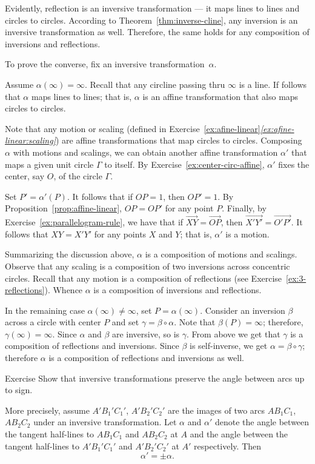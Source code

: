 Evidently, reflection is an inversive transformation --- it maps lines to lines and circles to circles.
According to Theorem~\ref{thm:inverse-cline}, any inversion is an inversive transformation as well.
Therefore, the same holds for any composition of inversions and reflections.

To prove the converse, 
fix an inversive transformation~$\alpha$.

Assume $\alpha(\infty)=\infty$.
Recall that any circline passing thru $\infty$ is a line.
If follows that $\alpha$ maps lines to lines;
that is,
$\alpha$ is an affine transformation that also maps circles to circles.

Note that any motion or scaling (defined in Exercise~\ref{ex:afine-linear}\textit{\ref{ex:afine-linear:scaling}}) are affine transformations that map circles to circles.
Composing $\alpha$ with motions and scalings, we can obtain another affine transformation $\alpha'$ that maps a given unit circle $\Gamma$ to itself.
By Exercise~\ref{ex:center-circ-affine},
$\alpha'$ fixes the center, say $O$, of the circle $\Gamma$.

Set $P'=\alpha'(P)$.
It follows that if $OP=1$, then $OP'=1$.
By Proposition~\ref{prop:affine-linear}, $OP=OP'$ for any point $P$.
Finally, by Exercise~\ref{ex:parallelogram-rule}, we have that if 
$\overrightarrow{XY}=\overrightarrow{OP}$, then $\overrightarrow{X'Y'}=\overrightarrow{O'P'}$.
It follows that $XY=X'Y'$ for any points $X$ and $Y$;
that is, $\alpha'$ is a motion.

Summarizing the discussion above, $\alpha$ is a composition of motions and scalings.
Observe that any scaling is a composition of two inversions across concentric circles.
Recall that any motion is a composition of reflections (see Exercise~\ref{ex:3-reflections}).
Whence $\alpha$ is a composition of inversions and reflections.


In the remaining case $\alpha(\infty)\ne \infty$, set $P=\alpha(\infty)$.
Consider an inversion $\beta$ across a circle with center $P$ and set $\gamma=\beta\circ\alpha$.
Note that $\beta(P)=\infty$; 
therefore, $\gamma(\infty)=\infty$.
Since $\alpha$ and $\beta$ are inversive, so is $\gamma$.
From above we get that $\gamma$ is a composition of reflections and inversions.
Since $\beta$ is self-inverse, we get
$\alpha=\beta\circ\gamma$;
therefore $\alpha$ is a composition of reflections and inversions as well.
\qeds

\begin{thm}{Exercise}\label{ex:inversive-angle}
Show that inversive transformations preserve the angle between arcs up to sign.

More precisely, assume $A'B_1'C_1'$, $A'B_2'C_2'$ are the images of two arcs $AB_1C_1$, $AB_2C_2$ under an inversive transformation.
Let $\alpha$ and $\alpha'$ denote the angle between the tangent half-lines to $AB_1C_1$ and $AB_2C_2$ at $A$
and the angle between the tangent half-lines to $A'B_1'C_1'$ and $A'B_2'C_2'$ at $A'$ respectively.
Then 
\[\alpha'=\pm \alpha.\]
\end{thm}


